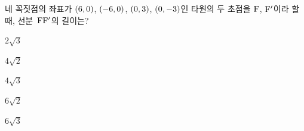 네 꼭짓점의 좌표가 $(6{,}\mkern3mu\mathopen{}0)$, $(-6{,}\mkern3mu\mathopen{}0)$, $(0{,}\mkern3mu\mathopen{}3)$, $(0{,}\mkern3mu\mathopen{}-3)$인 타원의 두 초점을 $\mathrm{F}$, $\mathrm{F}'$이라 할 때, 선분~$\mathrm{FF'}$의 길이는?
\begin{choices32}{\rule[-3ex]{0pt}{8ex}$2\sqrt{3}$}{\rule[-3ex]{0pt}{8ex}$4\sqrt{2}$}{\rule[-3ex]{0pt}{8ex}$4\sqrt{3}$}{\rule[-3ex]{0pt}{8ex}$6\sqrt{2}$}{\rule[-3ex]{0pt}{8ex}$6\sqrt{3}$}\end{choices32}
